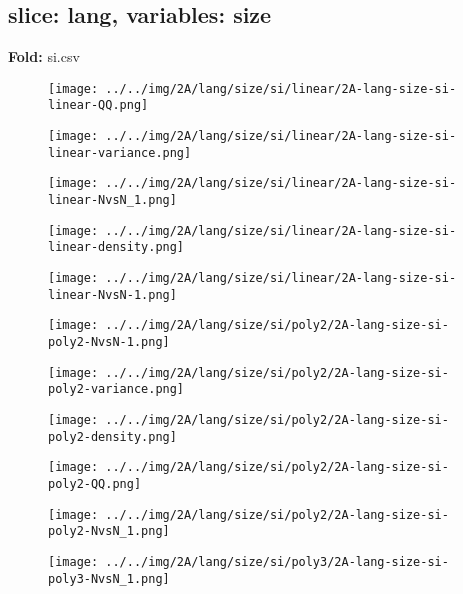 \subsection{slice: lang, variables: size}
\textbf{Fold:} si.csv
\begin{figure}[H]
\centering	\texttt{[image: ../../img/2A/lang/size/si/linear/2A-lang-size-si-linear-QQ.png]}
\end{figure}
\begin{figure}[H]
\centering	\texttt{[image: ../../img/2A/lang/size/si/linear/2A-lang-size-si-linear-variance.png]}
\end{figure}
\begin{figure}[H]
\centering	\texttt{[image: ../../img/2A/lang/size/si/linear/2A-lang-size-si-linear-NvsN\_1.png]}
\end{figure}
\begin{figure}[H]
\centering	\texttt{[image: ../../img/2A/lang/size/si/linear/2A-lang-size-si-linear-density.png]}
\end{figure}
\begin{figure}[H]
\centering	\texttt{[image: ../../img/2A/lang/size/si/linear/2A-lang-size-si-linear-NvsN-1.png]}
\end{figure}
\begin{figure}[H]
\centering	\texttt{[image: ../../img/2A/lang/size/si/poly2/2A-lang-size-si-poly2-NvsN-1.png]}
\end{figure}
\begin{figure}[H]
\centering	\texttt{[image: ../../img/2A/lang/size/si/poly2/2A-lang-size-si-poly2-variance.png]}
\end{figure}
\begin{figure}[H]
\centering	\texttt{[image: ../../img/2A/lang/size/si/poly2/2A-lang-size-si-poly2-density.png]}
\end{figure}
\begin{figure}[H]
\centering	\texttt{[image: ../../img/2A/lang/size/si/poly2/2A-lang-size-si-poly2-QQ.png]}
\end{figure}
\begin{figure}[H]
\centering	\texttt{[image: ../../img/2A/lang/size/si/poly2/2A-lang-size-si-poly2-NvsN\_1.png]}
\end{figure}
\begin{figure}[H]
\centering	\texttt{[image: ../../img/2A/lang/size/si/poly3/2A-lang-size-si-poly3-NvsN\_1.png]}
\end{figure}
